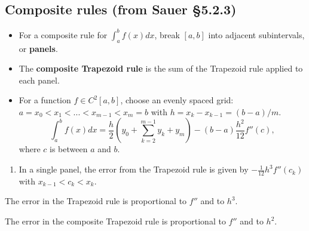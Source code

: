 \documentclass[12pt,letterpaper,noanswers]{exam}
\begin{document}
\subsection*{Composite rules (from Sauer \S 5.2.3)}
\begin{tcolorbox}

\begin{itemize}
\itemsep0pt
    \item For a composite rule for $\displaystyle\int_a^b f(x)dx$, break $[a,b]$ into adjacent subintervals, or \textbf{panels}.
    \item The \textbf{composite Trapezoid rule} is the sum of the Trapezoid rule applied to each panel.
    \item For a function $f\in C^2[a,b]$, choose an evenly spaced grid: $a = x_0<x_1<...<x_{m-1}<x_m = b$ with $h = x_k-x_{k-1} = (b-a)/m$.  \[\displaystyle\int_a^b f(x)dx = \frac{h}{2}\left(y_0 + \sum\limits_{k=2}^{m-1}y_k + y_m \right) - (b-a)\frac{h^2}{12}f''(c),\] where $c$ is between $a$ and $b$.
\end{itemize}
\end{tcolorbox}
\begin{enumerate}[resume=classQ]
    \item In a single panel, the error from the Trapezoid rule is given by $-\frac{1}{12}h^3f''(c_k)$ with $x_{k-1}<c_k<x_k$.
\end{enumerate}

The error in the Trapezoid rule is proportional to $f''$ and to $h^3$.

The error in the composite Trapezoid rule is proportional to $f''$ and to $h^2$.
\end{document}

